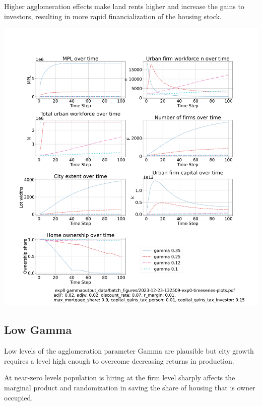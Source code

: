 \documentclass{article}
\begin{document}
Higher agglomeration effects make land rents higher and increase the gains to investors, resulting in more rapid financialization of the housing stock.

 

 \hspace*{-2.5cm}\includegraphics[trim= 1.5cm 3.65cm 2cm 4.0cm, clip, scale=.28]{fig/Analysis/Gamma-5-30.pdf}

\newpage %

\subsection{Low Gamma}
Low levels of the agglomeration parameter Gamma are plausible but city growth requires a level high enough to overcome decreasing returns in production.

At near-zero levels population is hiring at the firm level sharply affects  the marginal product and randomization in saving the share of housing that is owner occupied.
 
\end{document}
